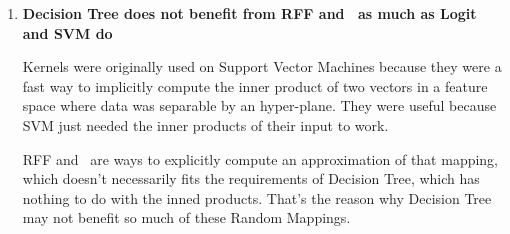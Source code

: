\begin{pre-delivery}
\begin{enumerate}
    It is possible that for some models, this is too much randomization of
    the data, and it coud have a bad effect on the learning process.

    \item \textbf{Decision Tree does not benefit from RFF and \Nys\ as much as
    Logit and SVM do}

    Kernels were originally used on Support Vector Machines because they were
    a fast way to implicitly compute the inner product of two vectors in a
    feature space where data was separable by an hyper-plane. They were
    useful because SVM just needed the inner products of their input to work.

    RFF and \Nys\ are ways to explicitly compute an approximation of that
    mapping, which doesn't necessarily fits the requirements of Decision Tree,
    which has nothing to do with the inned products. That's the reason why
    Decision Tree may not benefit so much of these Random Mappings.
  \end{enumerate}
\end{pre-delivery}
